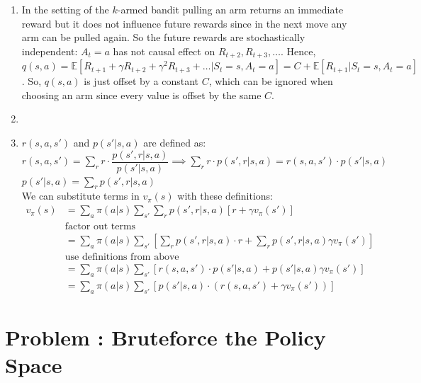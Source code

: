 \documentclass[12pt]{scrartcl}
\newcounter{exnum}
\newcommand{\exercise}[1]{\section*{Problem \theexnum\stepcounter{exnum}: #1}}
\begin{document}
\begin{enumerate}
  \item In the setting of the $k$-armed bandit pulling an arm returns an immediate reward
        but it does not influence future rewards since in the next move any arm can be pulled again.
        So the future rewards are stochastically independent: $A_t = a$ has not causal effect on $R_{t + 2}, R_{t + 3}, \ldots$. Hence,
        $q(s, a) = \mathbb{E}[R_{t+1} + \gamma R_{t+2} + \gamma^2 R_{t+3} + \ldots | S_t = s, A_t = a] = C + \mathbb{E}[R_{t+1}| S_t = s, A_t = a]$.
        So, $q(s, a)$ is just offset by a constant $C$, which can be ignored when choosing an arm since every value is offset by the same $C$.
  \item 
  \item $r(s, a, s')$ and $p(s' | s, a)$ are defined as:\\
        $r(s, a, s') = \sum_r r \cdot \dfrac{p(s', r | s, a)}{p(s' | s, a)} \implies \sum_r r \cdot p(s', r | s, a) = r(s, a, s') \cdot p(s' | s, a)$\\
        $p(s' | s, a) = \sum_r p(s', r | s, a)$\\
        We can substitute terms in $v_\pi(s)$ with these definitions:\\
        \begin{align*}
            v_\pi(s) &= \sum_{a} \pi(a | s) \sum_{s'} \sum_r p(s', r | s, a) \left[ r + \gamma v_\pi(s') \right] \\
                     &\text{factor out terms} \\
                     &= \sum_{a} \pi(a | s) \sum_{s'} \left[ \sum_r p(s', r | s, a) \cdot r + \sum_r p(s', r | s, a) \gamma v_\pi(s') \right] \\
                     &\text{use definitions from above} \\
                     &= \sum_{a} \pi(a | s) \sum_{s'} \left[ r(s, a, s') \cdot p(s' | s, a) + p(s' | s, a) \gamma v_\pi(s') \right] \\
                     &= \sum_{a} \pi(a | s) \sum_{s'} \left[ p(s' | s, a) \cdot (r(s, a, s') + \gamma v_\pi(s')) \right]
        \end{align*}

\end{enumerate}

\exercise{Bruteforce the Policy Space}
\end{document}
